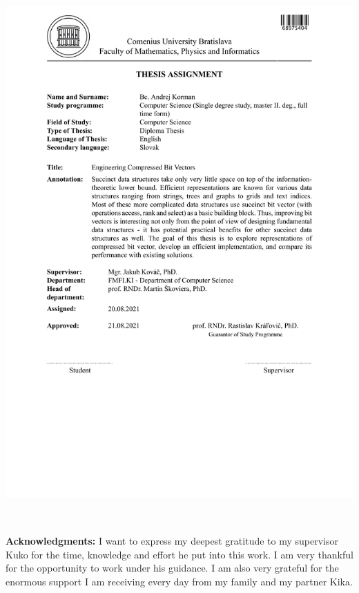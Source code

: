 \documentclass[12pt, twoside]{book}
\begin{document}
\hspace{-2cm}\includegraphics[width=1.1\textwidth]{images/zadanie-en}


\frontmatter

\setcounter{page}{3}
\newpage 
~

\vfill
{\bf Acknowledgments:} I want to express my deepest gratitude to my supervisor Kuko
for the time, knowledge and effort he put into this work. I am very thankful for the
opportunity to work under his guidance. I am also very grateful for the enormous
support I am receiving every day from my family and my partner Kika.
 

\newpage 
\end{document}
